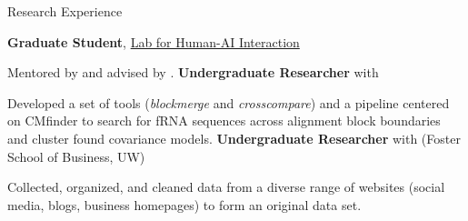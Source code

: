 \begin{rubric}{Research Experience}

	\textbf{Graduate Student}, \href{http://hai.cs.washington.edu}{Lab for Human-AI Interaction}
	\par Mentored by \pBansalG{} and advised by \pWeldD{}.
\entry*[2018 -- 2019]%
    \textbf{Undergraduate Researcher} with \pRuzzoL{}
    \par Developed a set of tools (\textit{blockmerge} and \textit{crosscompare}) and a pipeline centered on CMfinder to search for fRNA sequences across alignment block boundaries and cluster found covariance models.
\entry*[2018 -- 2019]%
	\textbf{Undergraduate Researcher} with \pPahnkeE{} (Foster School of Business, UW)
	\par Collected, organized, and cleaned data from a diverse range of websites (social media, blogs, business homepages) to form an original data set.
\end{rubric}